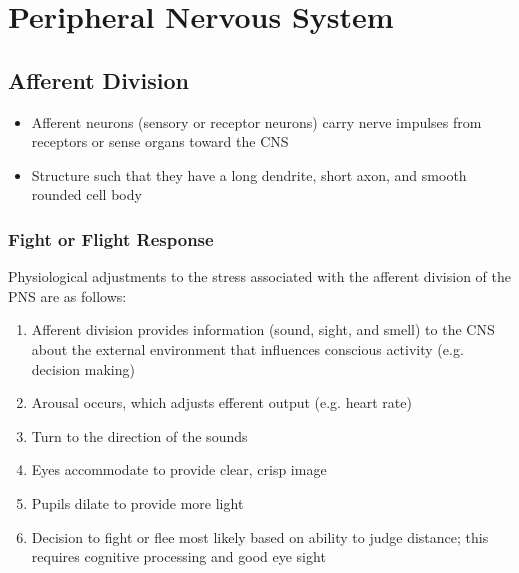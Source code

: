 \documentclass[11pt]{article}
\begin{document}
\section{Peripheral Nervous System}

\subsection{Afferent Division}
\begin{itemize}
\item Afferent neurons (sensory or receptor neurons) carry nerve impulses from receptors or sense organs toward the CNS
\item Structure such that they have a long dendrite, short axon, and smooth rounded cell body
\end{itemize}

\subsubsection{Fight or Flight Response}
Physiological adjustments to the stress associated with the afferent division of the PNS are as follows:
\begin{enumerate}
\item Afferent division provides information (sound, sight, and smell) to the CNS about the external environment that influences conscious activity (e.g. decision making)
\item Arousal occurs, which adjusts efferent output (e.g. heart rate)
\item Turn to the direction of the sounds
\item Eyes accommodate to provide clear, crisp image
\item Pupils dilate to provide more light
\item Decision to fight or flee most likely based on ability to judge distance; this requires cognitive processing and good eye sight
\end{enumerate}
\end{document}
